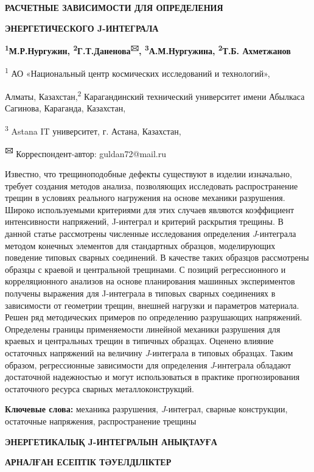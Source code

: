 {\bfseries РАСЧЕТНЫЕ ЗАВИСИМОСТИ ДЛЯ ОПРЕДЕЛЕНИЯ}

{\bfseries ЭНЕРГЕТИЧЕСКОГО J-ИНТЕГРАЛА}

{\bfseries \textsuperscript{1}М.Р.Нургужин,
\textsuperscript{2}Г.Т.Даненова\textsuperscript{🖂},
\textsuperscript{3}А.М.Нургужина, \textsuperscript{2}Т.Б. Ахметжанов}

\textsuperscript{1} АО «Национальный центр космических исследований и
технологий»,

Алматы, Казахстан,\textsuperscript{2} Карагандинский технический
университет имени Абылкаса Сагинова, Караганда, Казахстан,

\textsuperscript{3} Astana IT университет, г. Астана, Казахстан,

{\bfseries \textsuperscript{🖂}} Корреспондент-автор: guldan72@mail.ru

Известно, что трещиноподобные дефекты существуют в изделии изначально,
требует создания методов анализа, позволяющих исследовать
распространение трещин в условиях реального нагружения на основе
механики разрушения. Широко используемыми критериями для этих случаев
являются коэффициент интенсивности напряжений, J-интеграл и критерий
раскрытия трещины. В данной статье рассмотрены численные исследования
определения \emph{J}-интеграла методом конечных элементов для
стандартных образцов, моделирующих поведение типовых сварных соединений.
В качестве таких образцов рассмотрены образцы с краевой и центральной
трещинами. С позиций регрессионного и корреляционного анализов на основе
планирования машинных экспериментов получены выражения для J-интеграла в
типовых сварных соединениях в зависимости от геометрии трещин, внешней
нагрузки и параметров материала. Решен ряд методических примеров по
определению разрушающих напряжений. Определены границы применяемости
линейной механики разрушения для краевых и центральных трещин в типичных
образцах. Оценено влияние остаточных напряжений на величину
\emph{J}-интеграла в типовых образцах. Таким образом, регрессионные
зависимости для определения \emph{J}-интеграла обладают достаточной
надежностью и могут использоваться в практике прогнозирования
остаточного ресурса сварных металлоконструкций.

{\bfseries Ключевые слова:} механика разрушения, \emph{J}-интеграл, сварные
конструкции, остаточные напряжения, распространение трещины

{\bfseries ЭНЕРГЕТИКАЛЫҚ J-ИНТЕГРАЛЫН АНЫҚТАУҒА}

{\bfseries АРНАЛҒАН ЕСЕПТІК ТӘУЕЛДІЛІКТЕР}

